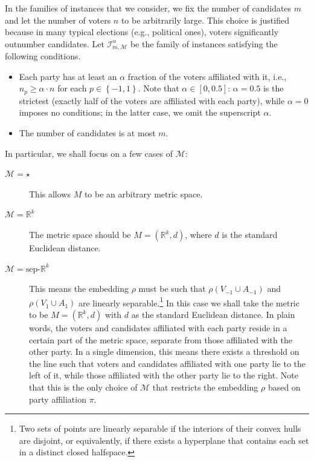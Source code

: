 \documentclass[letterpaper]{article} %
\theoremstyle{definition}
\newcommand{\set}[1]{\left\{#1\right\}}
\newcommand{\bbR}{\mathbb{R}}
\newcommand{\calI}{\mathcal{I}}
\newcommand{\calM}{\mathcal{M}}
\newcommand{\pleft}{-1}
\newcommand{\pright}{1}
\begin{document}
In the families of instances that we consider, we fix the number of candidates $m$ and let the number of voters $n$ to be arbitrarily large. This choice is justified because in many typical elections (e.g., political ones), voters significantly outnumber candidates. Let $\calI^{\alpha}_{m,\calM}$ be the family of instances satisfying the following conditions.
\begin{itemize}
	\item Each party has at least an $\alpha$ fraction of the voters affiliated with it, i.e., $n_p \ge \alpha \cdot n$ for each $p \in \set{\pleft,\pright}$. Note that $\alpha \in [0,0.5]$: $\alpha = 0.5$ is the strictest (exactly half of the voters are affiliated with each party), while $\alpha=0$ imposes no conditions; in the latter case, we omit the superscript $\alpha$.
	\item The number of candidates is at most $m$.%
	\end{itemize}
	In particular, we shall focus on a few cases of $\calM:$
\begin{description}
	\item[$\calM=\star$] This allows $M$ to be an arbitrary metric space.
	\item[$\calM = \bbR^k$] The metric space should be $M = (\bbR^k,d)$, where $d$ is the standard Euclidean distance.
	\item [$\calM = \textrm{sep-}\bbR^k$] This means the embedding $\rho$ must be such that $\rho(V_{\pleft} \cup A_{\pleft})$ and $\rho(V_{\pright} \cup A_{\pright})$ are linearly separable.\footnote{Two sets of points are linearly separable if the interiors of their convex hulls are disjoint, or equivalently, if there exists a hyperplane that contains each set in a distinct closed halfspace.} In this case we shall take the metric to be $M = (\bbR^k,d)$ with $d$ as the standard Euclidean distance. In plain words, the voters and candidates affiliated with each party reside in a certain part of the metric space, separate from those affiliated with the other party. In a single dimension, this means there exists a threshold on the line such that voters and candidates affiliated with one party lie to the left of it, while those affiliated with the other party lie to the right. %
	Note that this is the only choice of $\calM$ that restricts the embedding $\rho$ based on party affiliation $\pi$.
\end{description}
\end{document}
